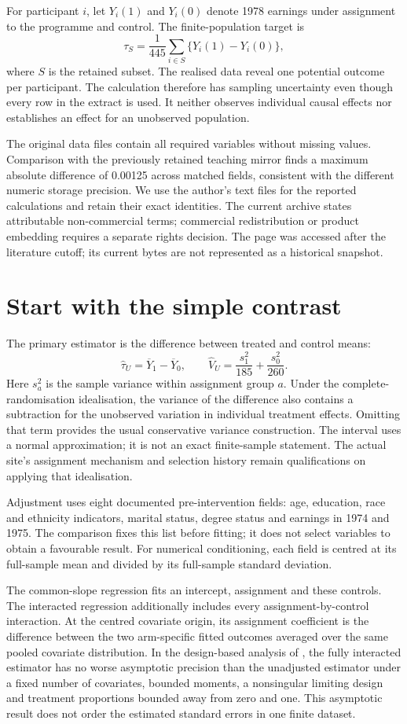 For participant $i$, let $Y_i(1)$ and $Y_i(0)$ denote 1978 earnings under
assignment to the programme and control. The finite-population target is
\[
 \tau_S=\frac{1}{445}\sum_{i\in S}\{Y_i(1)-Y_i(0)\},
\]
where $S$ is the retained subset. The realised data reveal one potential
outcome per participant. The calculation therefore has sampling uncertainty
even though every row in the extract is used. It neither observes individual
causal effects nor establishes an effect for an unobserved population.

The original data files contain all required variables without missing values.
Comparison with the previously retained teaching mirror finds a maximum
absolute difference of 0.00125 across matched fields, consistent with the
different numeric storage precision. We use the author's text files for the
reported calculations and retain their exact identities. The current archive
states attributable non-commercial terms; commercial redistribution or product
embedding requires a separate rights decision. The page was accessed after
the literature cutoff; its current bytes are not represented as a historical
snapshot. \citep{gap29data}

\section{Start with the simple contrast}
The primary estimator is the difference between treated and control means:
\[
 \widehat\tau_U=\overline Y_1-\overline Y_0,\qquad
 \widehat V_U=\frac{s_1^2}{185}+\frac{s_0^2}{260}.
\]
Here $s_a^2$ is the sample variance within assignment group $a$. Under the
complete-randomisation idealisation, the variance of the difference also
contains a subtraction for the unobserved variation in individual treatment
effects. Omitting that term provides the usual conservative variance
construction. The interval uses a normal approximation; it is not an exact
finite-sample statement. The actual site's assignment mechanism and selection
history remain qualifications on applying that idealisation.

Adjustment uses eight documented pre-intervention fields: age, education,
race and ethnicity indicators, marital status, degree status and earnings in
1974 and 1975. The comparison fixes this list before fitting; it does not
select variables to obtain a favourable result. For numerical conditioning,
each field is centred at its full-sample mean and divided by its full-sample
standard deviation.

The common-slope regression fits an intercept, assignment and these controls.
The interacted regression additionally includes every assignment-by-control
interaction. At the centred covariate origin, its assignment coefficient is
the difference between the two arm-specific fitted outcomes averaged over
the same pooled covariate distribution. In the design-based analysis of
\citet{gap29lin}, the fully interacted estimator has no worse asymptotic
precision than the unadjusted estimator under a fixed number of covariates,
bounded moments, a nonsingular limiting design and treatment proportions
bounded away from zero and one. This asymptotic result does not order the
estimated standard errors in one finite dataset.

